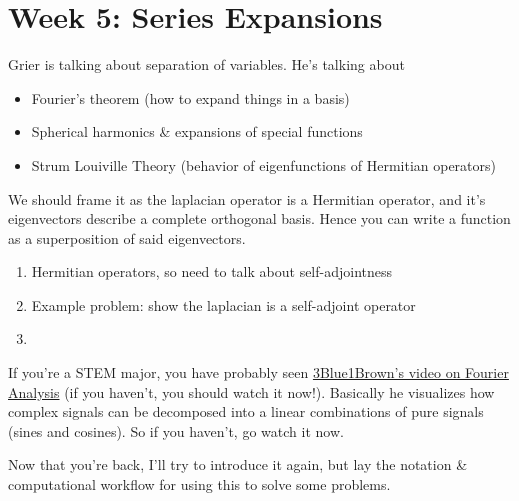 \documentclass[12pt,fleqn]{article}
\numberwithin{equation}{section} %
\newcounter{problem}
\begin{document}
\section{Week 5: Series Expansions}
\begin{sidework}
	Grier is talking about separation of variables. He's talking about
	\begin{itemize}
		\item Fourier's theorem (how to expand things in a basis)
		\item Spherical harmonics \& expansions of special functions
		\item Strum Louiville Theory (behavior of eigenfunctions of Hermitian operators)
	\end{itemize}
	We should frame it as the laplacian operator is a Hermitian operator, and it's eigenvectors describe a complete orthogonal basis. Hence you can write a function as a superposition of said eigenvectors.
\end{sidework}
\begin{enumerate}
	\item Hermitian operators, so need to talk about self-adjointness
	\item Example problem: show the laplacian is a self-adjoint operator
	\item 
\end{enumerate}

If you're a STEM major, you have probably seen \href{https://www.youtube.com/watch?v=spUNpyF58BY}
{3Blue1Brown's video on Fourier Analysis} (if you haven't, you should watch it now!). Basically he visualizes how complex signals can be decomposed into a linear combinations of pure signals (sines and cosines). So if you haven't, go watch it now.

Now that you're back, I'll try to introduce it again, but lay the notation \& computational workflow for using this to solve some problems.
\end{document}
